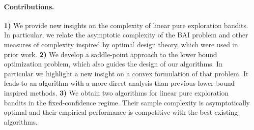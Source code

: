 \paragraph{Contributions.}
\textbf{1)}
We provide new insights on the complexity of linear pure exploration bandits. In particular, we relate the asymptotic complexity of the BAI problem and other measures of complexity inspired by optimal design theory, which were used in prior work.
\textbf{2)}
We develop a saddle-point approach to the lower bound optimization problem, which also guides the design of our algorithms. In particular we highlight a new insight on a convex formulation of that problem. It leads to an algorithm with a more direct analysis than previous lower-bound inspired methods.
\textbf{3)}
We obtain two algorithms for linear pure exploration bandits in the fixed-confidence regime. Their sample complexity is asymptotically optimal and their empirical performance is competitive with the best existing algorithms.

%
%
%
